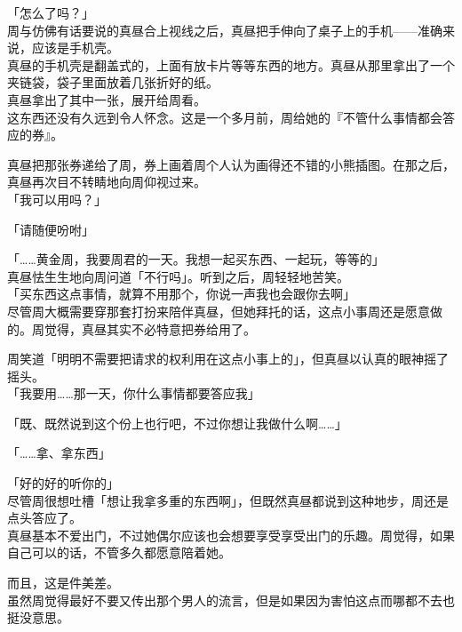 「怎么了吗？」\\

周与仿佛有话要说的真昼合上视线之后，真昼把手伸向了桌子上的手机——准确来说，应该是手机壳。\\

真昼的手机壳是翻盖式的，上面有放卡片等等东西的地方。真昼从那里拿出了一个夹链袋，袋子里面放着几张折好的纸。\\

真昼拿出了其中一张，展开给周看。\\

这东西还没有久远到令人怀念。这是一个多月前，周给她的『不管什么事情都会答应的券』。

真昼把那张券递给了周，券上画着周个人认为画得还不错的小熊插图。在那之后，真昼再次目不转睛地向周仰视过来。\\

「我可以用吗？」

「请随便吩咐」

「……黄金周，我要周君的一天。我想一起买东西、一起玩，等等的」\\

真昼怯生生地向周问道「不行吗」。听到之后，周轻轻地苦笑。\\

「买东西这点事情，就算不用那个，你说一声我也会跟你去啊」\\

尽管周大概需要穿那套打扮来陪伴真昼，但她拜托的话，这点小事周还是愿意做的。周觉得，真昼其实不必特意把券给用了。

周笑道「明明不需要把请求的权利用在这点小事上的」，但真昼以认真的眼神摇了摇头。\\

「我要用……那一天，你什么事情都要答应我」

「既、既然说到这个份上也行吧，不过你想让我做什么啊……」

「……拿、拿东西」

「好的好的听你的」\\

尽管周很想吐槽「想让我拿多重的东西啊」，但既然真昼都说到这种地步，周还是点头答应了。\\

真昼基本不爱出门，不过她偶尔应该也会想要享受享受出门的乐趣。周觉得，如果自己可以的话，不管多久都愿意陪着她。

而且，这是件美差。\\

虽然周觉得最好不要又传出那个男人的流言，但是如果因为害怕这点而哪都不去也挺没意思。\\

